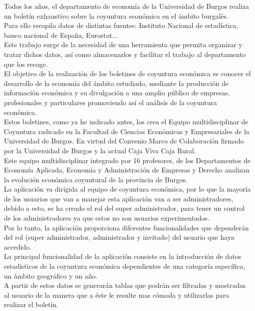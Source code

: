 
Todos los años, el departamento de economía de la Universidad de Burgos realiza un boletín exhaustivo sobre la coyuntura económica en el ámbito burgalés.\\
Para ello recopila datos de distintas fuentes: Instituto Nacional de estadística, banco nacional de España, Eurostat...\\
Este trabajo surge de la necesidad de una herramienta que permita organizar y tratar dichos datos, así como almacenarlos y facilitar el trabajo al departamento que los recoge.\\
El objetivo de la realización de los boletines de coyuntura económica es conocer el desarrollo de la economía del ámbito estudiado, mediante la producción de información económica y su divulgación a una amplio público de empresas, profesionales y particulares promoviendo así el análisis de la coyuntura económica.\\
Estos boletines, como ya he indicado antes, los crea el Equipo multidisciplinar de Coyuntura radicado en la Facultad de Ciencias Económicas y Empresariales de la Universidad de Burgos. En virtud del Convenio Marco de Colaboración firmado por la Universidad de Burgos y la actual Caja Viva Caja Rural.\\
Este equipo multidisciplinar integrado por 16 profesores, de los Departamentos de Economía Aplicada, Economía y Administración de Empresas y Derecho analizan la evolución económica coyuntural de la provincia de Burgos.\\
La aplicación va dirigida al equipo de coyuntura económica, por lo que la mayoría de los usuarios que van a manejar esta aplicación van a ser administradores, debido a esto, se ha creado el rol del super administrador, para tener un control de los administradores ya que estos no son usuarios experimentados.\\
Por lo tanto, la aplicación proporciona diferentes funcionalidades que dependerán del rol (super administrador, administrador y invitado) del usuario que haya accedido.\\
La principal funcionalidad de la aplicación consiste en la introducción de datos estadísticos de la coyuntura económica dependientes de una categoría específica, un ámbito geográfico y un
año.\\
A partir de estos datos se generarán tablas que podrán ser filtradas y mostradas al usuario de la manera que a éste le resulte mas cómoda y utilizarlas para realizar el boletín.\\
